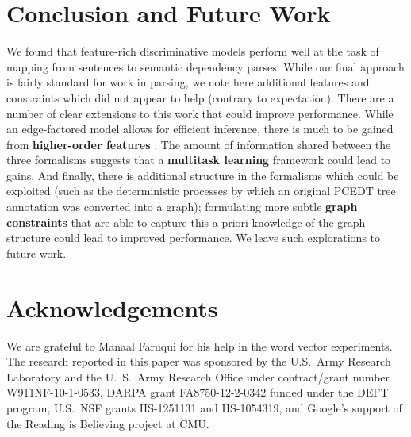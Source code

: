 \documentclass[11pt]{article}
\begin{document}
\section{Conclusion and Future Work}
We found that feature-rich discriminative models perform well at the task of
mapping from sentences to semantic dependency parses. 
While our final approach is fairly standard for work in parsing, we
note here additional features and constraints which did not
appear to help (contrary to expectation).
There are a number of clear extensions to this work that could improve
performance.
While an edge-factored model allows for efficient inference, there is
much to be gained from \textbf{higher-order features}
\citep{mcdonald_online_2006,martins_turning_2013}.
The amount of information
shared between the three formalisms suggests that a \textbf{multitask learning}
\citep{evgeniou_regularized_2004} framework could lead to gains.
And finally, there is additional structure in the formalisms which could be
exploited (such as the deterministic processes by which an original PCEDT tree annotation was converted into a graph); formulating more subtle \textbf{graph constraints} that are able to capture this a priori
knowledge of the graph structure could lead to improved performance.  We leave such explorations to future work.



\small
\section*{Acknowledgements}
We are grateful to Manaal Faruqui for his help in the word vector experiments.
The research reported in this paper was sponsored by the U.S.~Army Research
Laboratory and the U.~S.~Army Research Office under contract/grant number
W911NF-10-1-0533, DARPA grant FA8750-12-2-0342 funded under the DEFT
program, U.S.~NSF grants IIS-1251131 and IIS-1054319, and Google's
support of the Reading is Believing project at CMU.




\end{document}
